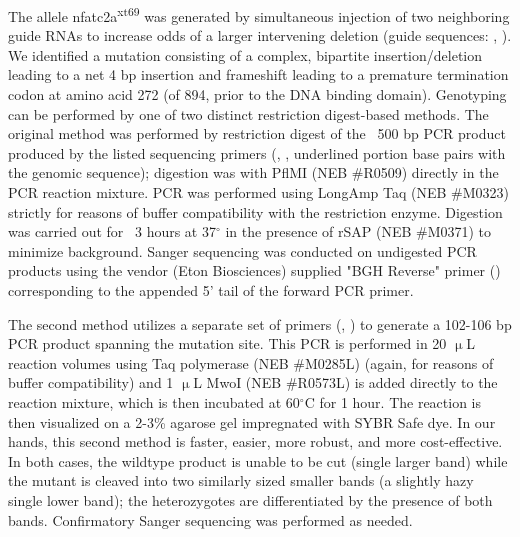The allele nfatc2a\textsuperscript{xt69} was generated by simultaneous injection of two neighboring guide RNAs to increase odds of a larger intervening deletion (guide sequences: , ). We identified a mutation consisting of a complex, bipartite insertion/deletion leading to a net 4 bp insertion and frameshift leading to a premature termination codon at amino acid 272 (of 894, prior to the DNA binding domain). Genotyping can be performed by one of two distinct restriction digest-based methods. The original method was performed by restriction digest of the ~500 bp PCR product produced by the listed sequencing primers (, , underlined portion base pairs with the genomic sequence); digestion was with PflMI (NEB \#R0509) directly in the PCR reaction mixture. PCR was performed using LongAmp Taq (NEB \#M0323) strictly for reasons of buffer compatibility with the restriction enzyme. Digestion was carried out for ~3 hours at 37$^{\circ}$ in the presence of rSAP (NEB \#M0371) to minimize background. Sanger sequencing was conducted on undigested PCR products using the vendor (Eton Biosciences) supplied "BGH Reverse" primer () corresponding to the appended 5' tail of the forward PCR primer. 

The second method utilizes a separate set of primers (, ) to generate a 102-106 bp PCR product spanning the mutation site. This PCR is performed in 20 $\upmu$L reaction volumes using Taq polymerase (NEB \#M0285L) (again, for reasons of buffer compatibility) and 1 $\upmu$L MwoI (NEB \#R0573L) is added directly to the reaction mixture, which is then incubated at 60$^{\circ}$C for 1 hour. The reaction is then visualized on a 2-3\% agarose gel impregnated with SYBR Safe dye. In our hands, this second method is faster, easier, more robust, and more cost-effective. In both cases, the wildtype product is unable to be cut (single larger band) while the mutant is cleaved into two similarly sized smaller bands (a slightly hazy single lower band); the heterozygotes are differentiated by the presence of both bands. Confirmatory Sanger sequencing was performed as needed.

